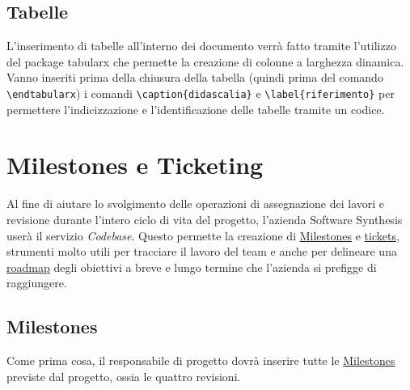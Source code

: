 \subsection{Tabelle}
L'inserimento di tabelle all'interno dei documento verrà fatto tramite l'utilizzo del package tabularx che permette la creazione di colonne a larghezza dinamica. Vanno inseriti prima della chiusura della tabella (quindi prima del comando \verb+\endtabularx+) i comandi \verb+\caption{didascalia}+ e \verb+\label{riferimento}+ per permettere l'indicizzazione e l'identificazione delle tabelle tramite un codice.

\newpage
\section{Milestones e Ticketing}
Al fine di aiutare lo svolgimento delle operazioni di assegnazione dei lavori e revisione durante l'intero ciclo di vita del progetto, l'azienda Software Synthesis userà il servizio \textit{Codebase}. Questo permette la creazione di \underline{Milestones} e \underline{tickets}, strumenti molto utili per tracciare il lavoro del team e anche per delineare una \underline{roadmap} degli obiettivi a breve e lungo termine che l'azienda si prefigge di raggiungere.

\subsection{Milestones}
Come prima cosa, il responsabile di progetto dovrà inserire tutte le \underline{Milestones} previste dal progetto, ossia le quattro revisioni.
